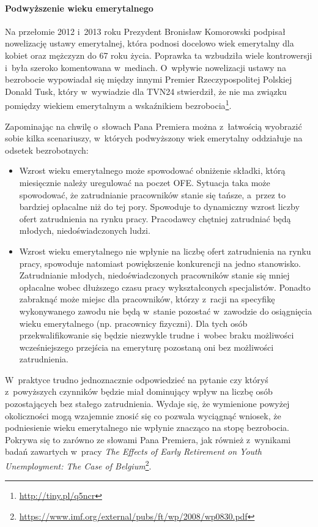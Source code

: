 \documentclass[12pt]{article}
\begin{document}
    \paragraph{Podwyższenie wieku emerytalnego}
    
    Na przełomie 2012 i~2013 roku Prezydent Bronisław Komorowski podpisał nowelizację ustawy emerytalnej, która podnosi docelowo wiek emerytalny dla kobiet oraz mężczyzn do 67 roku życia. Poprawka ta wzbudziła wiele kontrowersji i~była szeroko komentowana w~mediach. O~wpływie nowelizacji ustawy na bezrobocie wypowiadał się między innymi Premier Rzeczypospolitej Polskiej Donald Tusk, który w~wywiadzie dla TVN24 stwierdził, że nie ma związku pomiędzy wiekiem emerytalnym a wskaźnikiem bezrobocia\footnote{\url{http://tiny.pl/q5ncr}}.
    
    Zapominając na chwilę o~słowach Pana Premiera można z~łatwością wyobrazić sobie kilka scenariuszy, w~których podwyższony wiek emerytalny oddziałuje na odsetek bezrobotnych:
    
    \begin{itemize}
        \item Wzrost wieku emerytalnego może spowodować obniżenie składki, którą miesięcznie należy uregulować na poczet OFE. Sytuacja taka może spowodować, że zatrudnianie pracowników stanie się tańsze, a~przez to bardziej opłacalne niż do tej pory. Spowoduje to dynamiczny wzrost liczby ofert zatrudnienia na rynku pracy. Pracodawcy chętniej zatrudniać będą młodych, niedoświadczonych ludzi.
        \item Wzrost wieku emerytalnego nie wpłynie na liczbę ofert zatrudnienia na rynku pracy, spowoduje natomiast powiększenie konkurencji na jedno stanowisko. Zatrudnianie młodych, niedoświadczonych pracowników stanie się mniej opłacalne wobec dłuższego czasu pracy wykształconych specjalistów. Ponadto zabraknąć może miejsc dla pracowników, którzy z~racji na specyfikę wykonywanego zawodu nie będą w~stanie pozostać w~zawodzie do osiągnięcia wieku emerytalnego (np. pracownicy fizyczni). Dla tych osób przekwalifikowanie się będzie niezwykle trudne i~wobec braku możliwości wcześniejszego przejścia na emeryturę pozostaną oni bez możliwości zatrudnienia. 
    \end{itemize}
 
    W~praktyce trudno jednoznacznie odpowiedzieć na pytanie czy któryś z~powyższych czynników będzie miał dominujący wpływ na liczbę osób pozostających bez stałego zatrudnienia. Wydaje się, że wymienione powyżej okoliczności mogą wzajemnie znosić się co pozwala wyciągnąć wniosek, że podniesienie wieku emerytalnego nie wpłynie znacząco na stopę bezrobocia. Pokrywa się to zarówno ze słowami Pana Premiera, jak również z~wynikami badań zawartych w~pracy \emph{The Effects of Early Retirement on Youth Unemployment: The Case of Belgium}\footnote{\url{https://www.imf.org/external/pubs/ft/wp/2008/wp0830.pdf}}.
        
\end{document}
